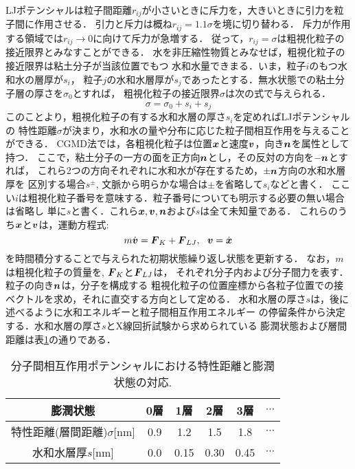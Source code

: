 LJポテンシャルは粒子間距離$r_{ij}$が小さいときに斥力を，大きいときに引力を粒子間に作用させる．
引力と斥力は概ね$r_{ij}=1.1\sigma$を境に切り替わる．
斥力が作用する領域では$r_{ij}\rightarrow 0$に向けて斥力が急増する．
従って，$r_{ij}=\sigma$は粗視化粒子の接近限界とみなすことができる．
水を非圧縮性物質とみなせば，粗視化粒子の接近限界は粘土分子が当該位置でもつ
水和水量できまる．いま，粒子$i$のもつ水和水の層厚が$s_i$，
粒子$j$の水和水層厚が$s_j$であったとする．無水状態での粘土分子層の厚さを$\sigma_0$とすれば，
粗視化粒子の接近限界$\sigma$は次の式で与えられる．
\begin{equation}
	\sigma=\sigma_0 +s_i+s_j
	\label{eqn:}
\end{equation}
このことより，粗視化粒子の有する水和水層の厚さ$s_i$を定めればLJポテンシャルの
特性距離$\sigma$が決まり，水和水の量や分布に応じた粒子間相互作用を与えることができる．
CGMD法では，各粗視化粒子は位置$\mbox{\boldmath $x$}$と速度$\mbox{\boldmath $v$}$，向き$\mbox{\boldmath $n$}$を属性として持つ．
ここで，粘土分子の一方の面を正方向$\mbox{\boldmath $n$}$とし，その反対の方向を$-\mbox{\boldmath $n$}$とすれば，
これら2つの方向それぞれに水和水が存在するため，$\pm\mbox{\boldmath $n$}$方向の水和水層厚を
区別する場合$s^\pm$, 文脈から明らかな場合は$\pm$を省略して$s_i$などと書く．
ここい$i$は粗視化粒子番号を意味する．粒子番号についても明示する必要の無い場合は省略し
単に$s$と書く．これら$\mbox{\boldmath $x$},\mbox{\boldmath $v$},\mbox{\boldmath $n$}$および$s$は全て未知量である．
これらのうち$\mbox{\boldmath $x$}$と$\mbox{\boldmath $v$}$は，運動方程式:
\begin{equation}
	m\dot{ \fat{v}}=\fat{F}_K+\fat{F}_{LJ}, \ \ \fat{v}=\dot{\fat{x}}
	\label{eqn:eq_motion}
\end{equation}
を時間積分することで与えられた初期状態繰り返し状態を更新する．
なお，$m$は粗視化粒子の質量を, $\mbox{\boldmath $F$}_K$と$\mbox{\boldmath $F$}_{LJ}$は，
それぞれ分子内および分子間力を表す．粒子の向き$\mbox{\boldmath $n$}$は，分子を構成する
粗視化粒子の位置座標から各粒子位置での接ベクトルを求め，それに直交する方向として定める．
水和水層の厚さ$s$は，後に述べるように水和エネルギーと粒子間相互作用エネルギー
の停留条件から決定する．水和水層の厚さ$s$とX線回折試験から求められている
膨潤状態および層間距離は表\ref{tbl:tbl_sig}の通りである．
\begin{table}[h]
	\begin{center}
	\caption{分子間相互作用ポテンシャルにおける特性距離と膨潤状態の対応.}
	\vspace{3mm}
	\begin{tabular}{c||c|c|c|c|c}
		膨潤状態 & 0層 & 1層 & 2層 & 3層 & $\cdots$\\
		\hline
		特性距離(層間距離)$\sigma$[{\rm nm}]& 0.9 & 1.2 & 1.5 & 1.8 & $\cdots$ \\
		\hline
		水和水層厚$s$[{\rm nm}] & 0.0 & 0.15 & 0.30 & 0.45 & $\cdots$
	\end{tabular}
	\label{tbl:tbl_sig}
	\end{center}
\end{table}
